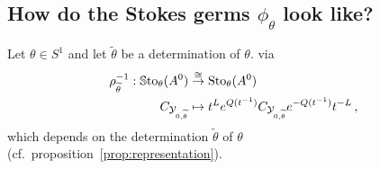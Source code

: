 \subsection{How do the Stokes germs $\phi_\theta$ look like?}
Let $\theta\in S^1$ and let $\tilde\theta$ be a determination of $\theta$.
via
\begin{align*}
  \rho_{\widetilde\theta}^{-1}:
  \operatorname{\mathbb{S}to}_\theta(A^0)
  &\overset{\cong}\to
  \operatorname{Sto}_\theta(A^0)
  \\C_{\mathcal{Y}_{0,\widetilde\theta}} &\mapsto
  t^{L}e^{Q(t^{-1})}C_{\mathcal{Y}_{0,\widetilde\theta}} e^{-Q(t^{-1})}t^{-L} \,,
\end{align*}
which depends on the determination $\tilde\theta$ of $\theta$ 
(cf.\ proposition~\ref{prop:representation}).
\begin{comment}
  \begin{rem}
    Since the normal solution $t^{L}e^{Q(t^{-1})}$ is diagonal in our case,
    does the Stokes germ in $\Sto_\theta(A^0)$ also have the zeros of
    $C_{\cY_{0,\tilde\theta}}$.
  \end{rem}
\end{comment}

